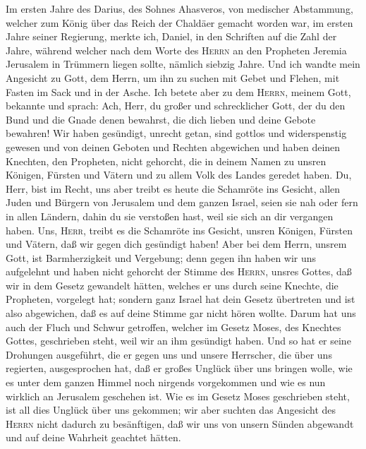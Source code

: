  Im ersten Jahre des Darius, des Sohnes Ahasveros, von
medischer Abstammung, welcher zum König über das Reich der Chaldäer
gemacht worden war,  im ersten Jahre seiner Regierung,
merkte ich, Daniel, in den Schriften auf die Zahl der Jahre, während
welcher nach dem Worte des \textsc{Herrn} an den Propheten Jeremia
Jerusalem in Trümmern liegen sollte, nämlich siebzig Jahre.
 Und ich wandte mein Angesicht zu Gott, dem Herrn, um ihn
zu suchen mit Gebet und Flehen, mit Fasten im Sack und in der Asche.
 Ich betete aber zu dem \textsc{Herrn}, meinem Gott,
bekannte und sprach: Ach, Herr, du großer und schrecklicher Gott, der du
den Bund und die Gnade denen bewahrst, die dich lieben und deine Gebote
bewahren!  Wir haben gesündigt, unrecht getan, sind
gottlos und widerspenstig gewesen und von deinen Geboten und Rechten
abgewichen  und haben deinen Knechten, den Propheten,
nicht gehorcht, die in deinem Namen zu unsren Königen, Fürsten und
Vätern und zu allem Volk des Landes geredet haben.  Du,
Herr, bist im Recht, uns aber treibt es heute die Schamröte ins Gesicht,
allen Juden und Bürgern von Jerusalem und dem ganzen Israel, seien sie
nah oder fern in allen Ländern, dahin du sie verstoßen hast, weil sie
sich an dir vergangen haben.  Uns, \textsc{Herr}, treibt
es die Schamröte ins Gesicht, unsren Königen, Fürsten und Vätern, daß
wir gegen dich gesündigt haben!  Aber bei dem Herrn,
unsrem Gott, ist Barmherzigkeit und Vergebung; denn gegen ihn haben wir
uns aufgelehnt  und haben nicht gehorcht der Stimme des
\textsc{Herrn}, unsres Gottes, daß wir in dem Gesetz gewandelt hätten,
welches er uns durch seine Knechte, die Propheten, vorgelegt hat;
 sondern ganz Israel hat dein Gesetz übertreten und ist
also abgewichen, daß es auf deine Stimme gar nicht hören wollte. Darum
hat uns auch der Fluch und Schwur getroffen, welcher im Gesetz Moses,
des Knechtes Gottes, geschrieben steht, weil wir an ihm gesündigt haben.
 Und so hat er seine Drohungen ausgeführt, die er gegen
uns und unsere Herrscher, die über uns regierten, ausgesprochen hat, daß
er großes Unglück über uns bringen wolle, wie es unter dem ganzen Himmel
noch nirgends vorgekommen und wie es nun wirklich an Jerusalem geschehen
ist.  Wie es im Gesetz Moses geschrieben steht, ist all
dies Unglück über uns gekommen; wir aber suchten das Angesicht des
\textsc{Herrn} nicht dadurch zu besänftigen, daß wir uns von unsern
Sünden abgewandt und auf deine Wahrheit geachtet hätten. 
